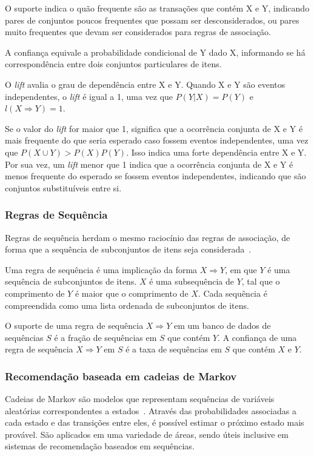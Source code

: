 O suporte indica o quão frequente são as transações que contém X e Y, indicando
pares de conjuntos poucos frequentes que possam ser desconsiderados, ou pares
muito frequentes que devam ser considerados para regras de associação.

A confiança equivale a probabilidade condicional de Y dado X, informando
se há correspondência entre dois conjuntos particulares de itens.

O \textit{lift} avalia o grau de dependência entre X e Y. Quando X e Y são
eventos independentes, o \textit{lift} é igual a 1, uma vez que $P(Y|X) = P(Y)$ e $l(X
\Rightarrow Y) = 1$.

Se o valor do \textit{lift} for maior que 1, significa que a
ocorrência conjunta de X e Y é mais frequente do que seria esperado caso fossem
eventos independentes, uma vez que $P(X \cup Y) > P(X)P(Y)$. Isso indica uma
forte dependência entre X e Y. Por sua vez, um \textit{lift}  menor que 1 indica
que a ocorrência conjunta de X e Y é menos frequente do esperado se fossem
eventos independentes, indicando que são conjuntos substituíveis entre si.

\subsubsection{Regras de Sequência}
Regras de sequência herdam o mesmo raciocínio das regras de associação, de forma
que a sequência de subconjuntos de itens seja considerada~\cite{liu2007web}.

Uma regra de sequência é uma implicação da forma $X \Rightarrow Y$, em que $Y$ é
uma sequência de subconjuntos de itens. $X$ é uma subsequência de $Y$, tal que o
comprimento de $Y$ é maior que o comprimento de $X$. Cada sequência é
compreendida como uma lista ordenada de subconjuntos de itens.

O suporte de uma regra de sequência $X \Rightarrow Y$ em um banco de dados de
sequências $S$ é a fração de sequências em $S$ que contém $Y$. A confiança de
uma regra de sequência $X \Rightarrow Y$ em $S$ é a taxa de sequências em
$S$ que contém $X$ e $Y$.
    
\subsubsection{Recomendação baseada em cadeias de Markov}
Cadeias de Markov são modelos que representam sequências de variáveis aleatórias
correspondentes a estados~\cite{ching2006markov}. Através das probabilidades
associadas a cada estado e das transições entre eles, é possível estimar o
próximo estado mais provável. São aplicados em uma variedade de áreas, sendo
úteis inclusive em sistemas de recomendação baseados em sequências.


